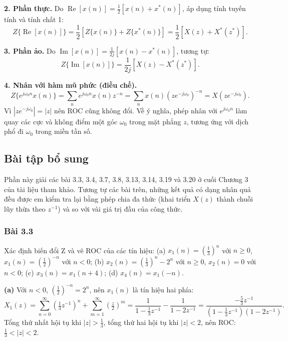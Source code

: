 \documentclass[12pt,a4paper]{article}
\begin{document}
\textbf{2. Phần thực.} Do $\operatorname{Re}[x(n)] = \frac{1}{2}\left[x(n) + x^*(n)\right]$, áp dụng tính tuyến tính và tính chất 1:
\[
    Z\{\operatorname{Re}[x(n)]\} = \frac{1}{2}\left[Z\{x(n)\} + Z\{x^*(n)\}\right] = \frac{1}{2}\left[X(z) + X^*(z^*)\right].
\]

\textbf{3. Phần ảo.} Do $\operatorname{Im}[x(n)] = \frac{1}{2j}\left[x(n) - x^*(n)\right]$, tương tự:
\[
    Z\{\operatorname{Im}[x(n)]\} = \frac{1}{2j}\left[X(z) - X^*(z^*)\right].
\]

\textbf{4. Nhân với hàm mũ phức (điều chế).}
\[
    Z\{e^{j\omega_0 n} x(n)\} = \sum_{n} e^{j\omega_0 n} x(n) z^{-n} = \sum_{n} x(n) \left(z e^{-j\omega_0}\right)^{-n} = X(z e^{-j\omega_0}).
\]
Vì $|z e^{-j\omega_0}| = |z|$ nên ROC cũng không đổi. Về ý nghĩa, phép nhân với $e^{j\omega_0 n}$ làm quay các cực và không điểm một góc $\omega_0$ trong mặt phẳng $z$, tương ứng với dịch phổ đi $\omega_0$ trong miền tần số.

\subsection{Bài tập bổ sung}
Phần này giải các bài 3.3, 3.4, 3.7, 3.8, 3.13, 3.14, 3.19 và 3.20 ở cuối Chương 3 của tài liệu tham khảo. Tương tự các bài trên, những kết quả có dạng nhân quả đều được em kiểm tra lại bằng phép chia đa thức (khai triển $X(z)$ thành chuỗi lũy thừa theo $z^{-1}$) và so với vài giá trị đầu của công thức.

\subsubsection*{Bài 3.3}
\begin{mdframed}[style=exbox]
Xác định biến đổi Z và vẽ ROC của các tín hiệu:
(a) $x_1(n) = \left(\frac{1}{3}\right)^n$ với $n \ge 0$, $x_1(n) = \left(\frac{1}{2}\right)^{-n}$ với $n < 0$;
(b) $x_2(n) = \left(\frac{1}{3}\right)^n - 2^n$ với $n \ge 0$, $x_2(n) = 0$ với $n < 0$;
(c) $x_3(n) = x_1(n+4)$;
(d) $x_4(n) = x_1(-n)$.
\end{mdframed}

\textbf{(a)} Với $n < 0$, $\left(\frac{1}{2}\right)^{-n} = 2^n$, nên $x_1(n)$ là tín hiệu hai phía:
\[
    X_1(z) = \sum_{n=0}^{\infty} \left(\tfrac{1}{3}z^{-1}\right)^n + \sum_{m=1}^{\infty} \left(\tfrac{z}{2}\right)^m
    = \frac{1}{1 - \frac{1}{3}z^{-1}} - \frac{1}{1 - 2z^{-1}}
    = \frac{-\frac{5}{3}z^{-1}}{\left(1 - \frac{1}{3}z^{-1}\right)(1 - 2z^{-1})}.
\]
Tổng thứ nhất hội tụ khi $|z| > \frac{1}{3}$, tổng thứ hai hội tụ khi $|z| < 2$, nên ROC: $\frac{1}{3} < |z| < 2$.
\end{document}
